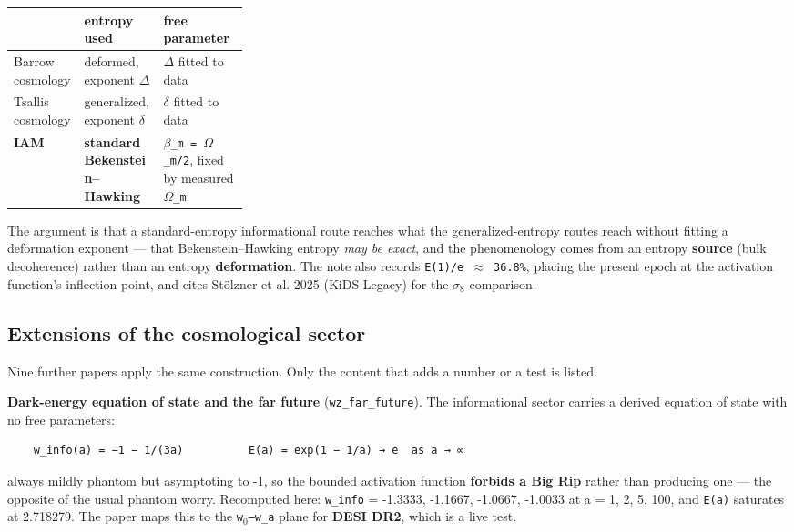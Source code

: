 \documentclass[12pt,a4paper]{article}
\begin{document}
\begin{small}
\begin{tabularx}{\linewidth}{L{0.30\linewidth}YY}
\toprule
\textbf{} & \textbf{entropy used} & \textbf{free parameter} \\
\midrule
Barrow cosmology & deformed, exponent \texttt{$\Delta$} & \texttt{$\Delta$} fitted to data \\
Tsallis cosmology & generalized, exponent \texttt{$\delta$} & \texttt{$\delta$} fitted to data \\
\textbf{IAM} & \textbf{standard Bekenstein--Hawking} & \texttt{$\beta$\_\allowbreak{}m = $\Omega$\_\allowbreak{}m/\allowbreak{}2}, fixed by measured \texttt{$\Omega$\_\allowbreak{}m} \\
\bottomrule
\end{tabularx}
\end{small}


The argument is that a standard-entropy informational route reaches what the generalized-entropy routes reach without fitting a deformation exponent --- that Bekenstein--Hawking entropy \textit{may be exact}, and the phenomenology comes from an entropy \textbf{source} (bulk decoherence) rather than an entropy \textbf{deformation}. The note also records \texttt{E(1)/e $\approx$ 36.8\%}, placing the present epoch at the activation function's inflection point, and cites Stölzner et al. 2025 (KiDS-Legacy) for the \texttt{$\sigma_{8}$} comparison.





\subsection{Extensions of the cosmological sector}

Nine further papers apply the same construction. Only the content that adds a number or a test is listed.


\textbf{Dark-energy equation of state and the far future} (\texttt{wz\_far\_future}). The informational sector carries a derived equation of state with no free parameters:


\begin{lstlisting}
    w_info(a) = −1 − 1/(3a)          E(a) = exp(1 − 1/a) → e  as a → ∞
\end{lstlisting}


always mildly phantom but asymptoting to -1, so the bounded activation function \textbf{forbids a Big Rip} rather than producing one --- the opposite of the usual phantom worry. Recomputed here: \texttt{w\_info} = -1.3333, -1.1667, -1.0667, -1.0033 at a = 1, 2, 5, 100, and \texttt{E(a)} saturates at 2.718279. The paper maps this to the \texttt{w$_{0}$--w\_a} plane for \textbf{DESI DR2}, which is a live test.
\end{document}
